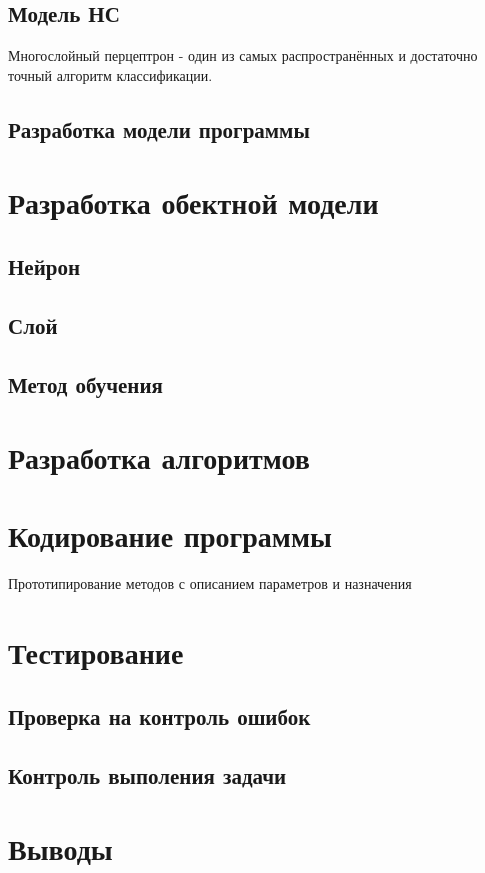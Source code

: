 \documentclass[a4paper,12pt]{article}
\begin{document}
\subsection{Модель НС}
Многослойный перцептрон - один из самых распространённых и достаточно точный алгоритм классификации.
\subsection{Разработка модели программы}

\newpage\section{Разработка обектной модели}

\subsection{Нейрон}
\subsection{Слой}
\subsection{Метод обучения}

\newpage\section{Разработка алгоритмов}

\newpage\section{Кодирование программы}
Прототипирование методов с описанием параметров и назначения

\newpage\section{Тестирование}
\subsection{Проверка на контроль ошибок}
\subsection{Контроль выполения задачи}

\newpage\section*{Выводы}
\end{document}
